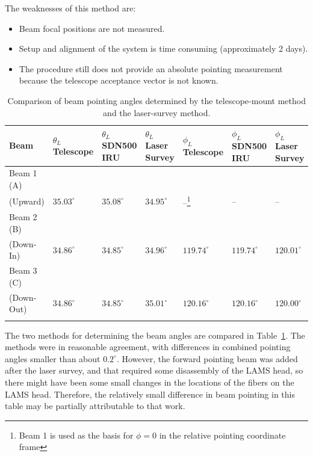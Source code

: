 \documentclass[12pt,twoside,english]{article}\usepackage[]{graphicx}\usepackage[]{color}
\providecommand{\tabularnewline}{\\}
\begin{document}
{{The weaknesses of this method are:  
\begin{itemize}
\item Beam focal positions are not measured. 

\item Setup and alignment of the system is time consuming (approximately 2 days). 

\item The procedure still does not provide an absolute pointing measurement because the telescope acceptance vector is not known.  
\end{itemize}

\begin{table}
{\footnotesize{}}%
\begin{minipage}[t]{0.93\columnwidth}%
\begin{tabular}{>{\centering}p{1.8cm}>{\centering}p{1.8cm}>{\centering}p{1.8cm}>{\centering}p{1.8cm}>{\centering}p{1.8cm}>{\centering}p{1.8cm}>{\centering}p{1.8cm}}
\toprule 
\textbf{Beam}  &
\textbf{$\theta_{L}$ Telescope}  &
\textbf{$\theta_{L}$ SDN500 IRU}  &
\textbf{$\theta_{L}$ Laser Survey}  &
\textbf{$\phi_{L}$ Telescope}  &
\textbf{$\phi_{L}$ SDN500 IRU}  &
\textbf{$\phi_{L}$ Laser Survey}\tabularnewline
\midrule
\midrule 
Beam 1 (A) &
 &
 &
 &
 &
 &
\tabularnewline
(Upward)  &
$35.03^{\circ}$  &
$35.08^{\circ}$  &
$34.95^{\circ}$  &
--\footnote{Beam 1 is used as the basis for $\phi=0$ in the relative pointing
coordinate frame}  &
--  &
-- \tabularnewline
\midrule 
Beam 2 (B) &
 &
 &
 &
 &
 &
\tabularnewline
(Down-In)  &
$34.86^{\circ}$  &
$34.85^{\circ}$  &
$34.96^{\circ}$  &
$119.74^{\circ}$  &
$119.74^{\circ}$  &
$120.01^{\circ}$\tabularnewline
\midrule 
Beam 3 (C) &
 &
 &
 &
 &
 &
\tabularnewline
(Down-Out)  &
$34.86^{\circ}$  &
$34.85^{\circ}$  &
$35.01^{\circ}$  &
$120.16^{\circ}$  &
$120.16^{\circ}$  &
$120.00^{\circ}$\tabularnewline
\midrule 
  &
 &
 &
 &
 &
 &
\tabularnewline
\end{tabular}%
\end{minipage}{\footnotesize \par}
\protect\caption{Comparison of beam pointing angles determined by the telescope-mount method and the laser-survey method.\label{tab:PointingAngles}}
\end{table}

The two methods for determining the beam angles are compared in Table~\ref{tab:PointingAngles}. The methods were in reasonable agreement, with differences in combined pointing angles smaller than about $0.2^{\circ}$. However, the forward pointing beam was added after the laser survey, and that required some disassembly of the LAMS head, so there might have been some small changes in the locations of the fibers on the LAMS head. Therefore, the relatively small difference in beam pointing in this table may be partially attributable to that work. 

}}
\end{document}
